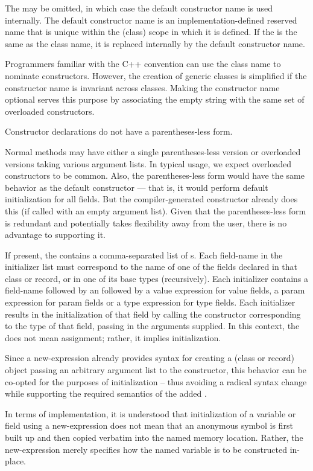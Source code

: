 The  may be omitted, in which case the default
constructor name is used internally.  The default constructor name is an
implementation-defined reserved name that is unique within the (class) scope in
which it is defined.  If the  is
the same as the class name, it is replaced internally by the default constructor name.
\begin{rationale}
Programmers familiar with the C++ convention can use the class name to nominate
constructors.  However, the creation of generic classes is simplified if the
constructor name is invariant across classes.  Making the constructor name
optional serves this purpose by associating the empty string with the same set
of overloaded constructors.
\end{rationale}

Constructor declarations do not have a parentheses-less form.
\begin{rationale}
Normal methods may have either a single parentheses-less version or overloaded
versions taking various argument lists.  In typical usage, we expect overloaded
constructors to be common.  Also, the parentheses-less form would have the same
behavior as the default constructor --- that is, it would perform default
initialization for all fields.  But the compiler-generated constructor already
does this (if called with an empty argument list).  Given that the
parentheses-less form is redundant and potentially takes flexibility away from
the user, there is no advantage to supporting it.
\end{rationale}

If present, the  contains a comma-separated list of
s.  Each field-name in the initializer list must correspond to the name
of one of the fields declared in that class or record, or in one of its base types
(recursively).  Each initializer contains a field-name followed by an
\chpl{=} followed by a value expression for value fields, a param expression for param fields or a type expression for type fields.
Each initializer results in the initialization of that field by
calling the constructor corresponding to the type of that field, passing in the arguments
supplied.  In this context, the \chpl{=} does not mean assignment; rather, it implies
initialization.

\begin{rationale}
Since a new-expression already provides syntax for creating a (class or record) object
passing an arbitrary argument list to the constructor, this behavior can be co-opted for
the purposes of initialization -- thus avoiding a radical syntax change while supporting
the required semantics of the added .  

In terms of implementation, it is understood that initialization of a variable or field
using a new-expression does not mean that an anonymous symbol is first built up and then
copied verbatim into the named memory location.  Rather, the new-expression merely
specifies how the named variable is to be constructed in-place.
\end{rationale}

